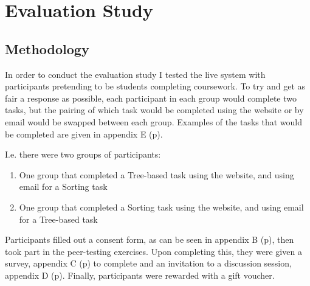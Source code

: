 \documentclass[a4paper,11pt]{report}
\begin{document}
\chapter{Evaluation Study}
\doublespacing
\label{ch:eval}
\section{Methodology}
In order to conduct the evaluation study I tested the live system with participants pretending to be students completing coursework. To try and get as fair a response as possible, each participant in each group would complete two tasks, but the pairing of which task would be completed using the website or by email would be swapped between each group. Examples of the tasks that would be completed are given in appendix E (p\pageref{app:descriptors}).\par
I.e. there were two groups of participants:
\begin{enumerate}
	\item One group that completed a Tree-based task using the website, and using email for a Sorting task
	\item One group that completed a Sorting task using the website, and using email for a Tree-based task
\end{enumerate}
Participants filled out a consent form, as can be seen in appendix B (p\pageref{app:consent}), then took part in the peer-testing exercises. Upon completing this, they were given a survey, appendix C (p\pageref{app:survey}) to complete and an invitation to a discussion session, appendix D (p\pageref{app:discussion}). Finally, participants were rewarded with a gift voucher.
\end{document}
